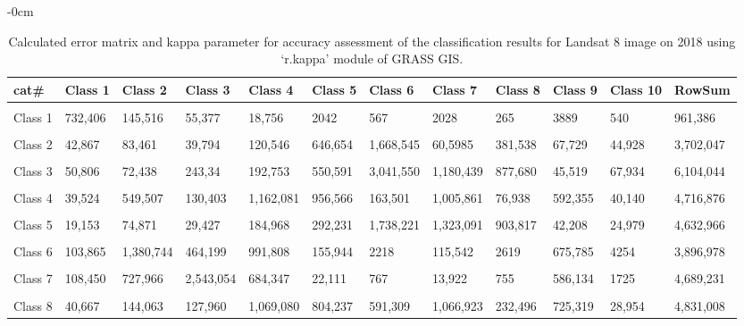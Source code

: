 \documentclass[analytics,article,accept,pdftex,moreauthors]{Definitions/mdpi}
\begin{document}
\begin{table}[H] 
    \caption{Calculated error matrix and kappa parameter for accuracy assessment of the classification results for Landsat 8 image on 2018 using `r.kappa' module of GRASS GIS.}%
    \begin{adjustwidth}{-\extralength}{0cm}
 	\begin{tabularx}{\fulllength}{lllllllllllL}
    \toprule
         \textbf{cat\#} & \textbf{Class 1} & \textbf{Class 2} & \textbf{Class 3} & \textbf{Class 4} & \textbf{Class 5} & \textbf{Class 6} & \textbf{Class 7} & \textbf{Class 8} & \textbf{Class 9} & \textbf{Class 10} & \textbf{RowSum} \\ \hline
      &&&&&&&&&&&\\[-2ex]
        Class 1 & 732,406 & 145,516 & 55,377 & 18,756 & 2042 & 567 & 2028 & 265 & 3889 & 540 & 961,386 \\ \hline
      &&&&&&&&&&&\\[-2ex]
        Class 2 & 42,867 & 83,461 & 39,794 & 120,546 & 646,654 & 1,668,545 & 60,5985 & 381,538 & 67,729 & 44,928 & 3,702,047 \\ \hline
      &&&&&&&&&&&\\[-2ex]
        Class 3 & 50,806 & 72,438 & 243,34 & 192,753 & 550,591 & 3,041,550 & 1,180,439 & 877,680 & 45,519 & 67,934 & 6,104,044 \\ \hline
      &&&&&&&&&&&\\[-2ex]
        Class 4 & 39,524 & 549,507 & 130,403 & 1,162,081 & 956,566 & 163,501 & 1,005,861 & 76,938 & 592,355 & 40,140 & 4,716,876 \\ \hline
      &&&&&&&&&&&\\[-2ex]
        Class 5 & 19,153 & 74,871 & 29,427 & 184,968 & 292,231 & 1,738,221 & 1,323,091 & 903,817 & 42,208 & 24,979 & 4,632,966 \\ \hline
      &&&&&&&&&&&\\[-2ex]
        Class 6 & 103,865 & 1,380,744 & 464,199 & 991,808 & 155,944 & 2218 & 115,542 & 2619 & 675,785 & 4254 & 3,896,978 \\ \hline
      &&&&&&&&&&&\\[-2ex]
        Class 7 & 108,450 & 727,966 & 2,543,054 & 684,347 & 22,111 & 767 & 13,922 & 755 & 586,134 & 1725 & 4,689,231 \\ \hline
      &&&&&&&&&&&\\[-2ex]
        Class 8 & 40,667 & 144,063 & 127,960 & 1,069,080 & 804,237 & 591,309 & 1,066,923 & 232,496 & 725,319 & 28,954 & 4,831,008 \\ \hline

\end{tabularx}
\end{adjustwidth}
\end{table}
\end{document}
